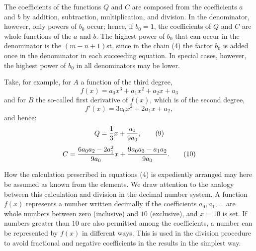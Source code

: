 
The coefficients of the functions $Q$ and $C$ are composed from the
coefficients $a$ and $b$ by addition, subtraction, multiplication,
and division. In the denominator, however, only powers of $b_0$
occur; hence, if $b_0=1$, the coefficients of $Q$ and $C$ are whole
functions of the $a$ and $b$. The highest power of $b_0$ that can
occur in the denominator is the $(m-n+1)$st, since in the chain (4)
the factor $b_0$ is added once in the denominator in each succeeding
equation. In special cases, however, the highest power of $b_0$ in
all denominators may be lower.

Take, for example, for $A$ a function of the third degree,
\begin{equation}
 f(x)=a_0x^3+a_1x^2+a_2x+a_3
\tag{7}
\end{equation}
and for $B$ the so-called first derivative of $f(x)$, which is of the
second degree,
\begin{equation}
 f'(x)=3a_0x^2+2a_1x+a_2,
\tag{8}
\end{equation}
and hence:
\begin{equation}
 Q={1\over 3}x+{a_1\over 9a_0},
\tag{9}
\end{equation}
\begin{equation}
 C={6a_0a_2-2a_1^2\over 9a_0}x
   +{9a_0a_3-a_1a_2\over 9a_0}.
\tag{10}
\end{equation}

How the calculation prescribed in equations (4) is expediently
arranged may here be assumed as known from the elements. We draw
attention to the analogy between this calculation and division in the
decimal number system. A function $f(x)$ represents a number written
decimally if the coefficients $a_0,a_1,\ldots$ are whole numbers
between zero (inclusive) and $10$ (exclusive), and $x=10$ is set. If
numbers greater than $10$ are also permitted among the coefficients,
a number can be represented by $f(x)$ in different ways. This is used
in the division procedure to avoid fractional and negative
coefficients in the results in the simplest way.
